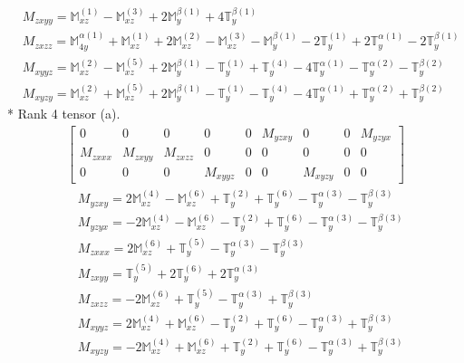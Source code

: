 \documentclass[fleqn,8pt,landscape]{jsarticle}
\begin{document}
\begin{align*}
& M_{zxyy} = \mathbb{M}_{xz}^{(1)} - \mathbb{M}_{xz}^{(3)} + 2 \mathbb{M}_{y}^{\beta(1)} + 4 \mathbb{T}_{y}^{\beta(1)} \\
& M_{zxzz} = \mathbb{M}_{4y}^{\alpha(1)} + \mathbb{M}_{xz}^{(1)} + 2 \mathbb{M}_{xz}^{(2)} - \mathbb{M}_{xz}^{(3)} - \mathbb{M}_{y}^{\beta(1)} - 2 \mathbb{T}_{y}^{(1)} + 2 \mathbb{T}_{y}^{\alpha(1)} - 2 \mathbb{T}_{y}^{\beta(1)} \\
& M_{xyyz} = \mathbb{M}_{xz}^{(2)} - \mathbb{M}_{xz}^{(5)} + 2 \mathbb{M}_{y}^{\beta(1)} - \mathbb{T}_{y}^{(1)} + \mathbb{T}_{y}^{(4)} - 4 \mathbb{T}_{y}^{\alpha(1)} - \mathbb{T}_{y}^{\alpha(2)} - \mathbb{T}_{y}^{\beta(2)} \\
& M_{xyzy} = \mathbb{M}_{xz}^{(2)} + \mathbb{M}_{xz}^{(5)} + 2 \mathbb{M}_{y}^{\beta(1)} - \mathbb{T}_{y}^{(1)} - \mathbb{T}_{y}^{(4)} - 4 \mathbb{T}_{y}^{\alpha(1)} + \mathbb{T}_{y}^{\alpha(2)} + \mathbb{T}_{y}^{\beta(2)}
\end{align*}
* Rank 4 tensor (a).
\begin{align*}
\begin{bmatrix} 0 & 0 & 0 & 0 & 0 & M_{yzxy} & 0 & 0 & M_{yzyx} \\ M_{zxxx} & M_{zxyy} & M_{zxzz} & 0 & 0 & 0 & 0 & 0 & 0 \\ 0 & 0 & 0 & M_{xyyz} & 0 & 0 & M_{xyzy} & 0 & 0 \end{bmatrix}
\end{align*}
\begin{align*}
& M_{yzxy} = 2 \mathbb{M}_{xz}^{(4)} - \mathbb{M}_{xz}^{(6)} + \mathbb{T}_{y}^{(2)} + \mathbb{T}_{y}^{(6)} - \mathbb{T}_{y}^{\alpha(3)} - \mathbb{T}_{y}^{\beta(3)} \\
& M_{yzyx} = - 2 \mathbb{M}_{xz}^{(4)} - \mathbb{M}_{xz}^{(6)} - \mathbb{T}_{y}^{(2)} + \mathbb{T}_{y}^{(6)} - \mathbb{T}_{y}^{\alpha(3)} - \mathbb{T}_{y}^{\beta(3)} \\
& M_{zxxx} = 2 \mathbb{M}_{xz}^{(6)} + \mathbb{T}_{y}^{(5)} - \mathbb{T}_{y}^{\alpha(3)} - \mathbb{T}_{y}^{\beta(3)} \\
& M_{zxyy} = \mathbb{T}_{y}^{(5)} + 2 \mathbb{T}_{y}^{(6)} + 2 \mathbb{T}_{y}^{\alpha(3)} \\
& M_{zxzz} = - 2 \mathbb{M}_{xz}^{(6)} + \mathbb{T}_{y}^{(5)} - \mathbb{T}_{y}^{\alpha(3)} + \mathbb{T}_{y}^{\beta(3)} \\
& M_{xyyz} = 2 \mathbb{M}_{xz}^{(4)} + \mathbb{M}_{xz}^{(6)} - \mathbb{T}_{y}^{(2)} + \mathbb{T}_{y}^{(6)} - \mathbb{T}_{y}^{\alpha(3)} + \mathbb{T}_{y}^{\beta(3)} \\
& M_{xyzy} = - 2 \mathbb{M}_{xz}^{(4)} + \mathbb{M}_{xz}^{(6)} + \mathbb{T}_{y}^{(2)} + \mathbb{T}_{y}^{(6)} - \mathbb{T}_{y}^{\alpha(3)} + \mathbb{T}_{y}^{\beta(3)}
\end{align*}
\end{document}
